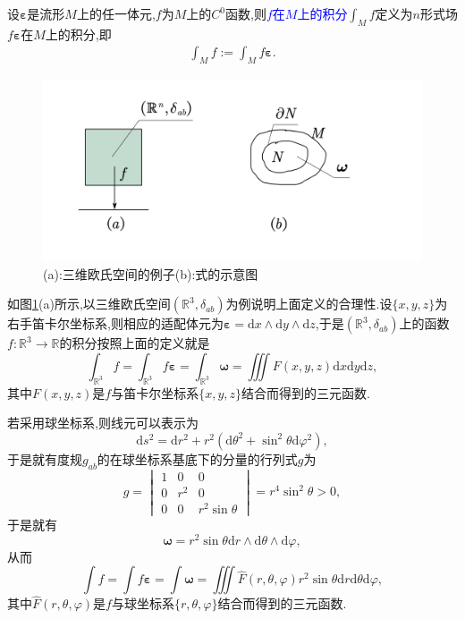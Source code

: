 设$\boldsymbol{\varepsilon}$是流形$M$上的任一体元,$f$为$M$上的$C^0$函数,则\textcolor{blue}{$f$在$M$上的积分}$\displaystyle \int_M f$定义为$n$形式场$f\boldsymbol{\varepsilon}$在$M$上的积分,即
\begin{align}
\int_Mf:=\int_M f\boldsymbol{\varepsilon}.
\end{align}
\begin{remark}
\begin{figure}[htbp]
    \centering
 \includegraphics[width=\textwidth]{Pictures/5-5.png}
    \caption{(a):三维欧氏空间的例子(b):式的示意图}
    \label{fig:5-5}
\end{figure}

如图\ref{fig:5-5}(a)所示,以三维欧氏空间$(\mathbb{R}^3,\delta_{ab})$为例说明上面定义的合理性.设$\{x,y,z\}$为右手笛卡尔坐标系,则相应的适配体元为$\boldsymbol{\varepsilon}=\mathrm{d}x\wedge\mathrm{d}y\wedge\mathrm{d}z$,于是$(\mathbb{R}^3,\delta_{ab})$上的函数$f:\mathbb{R}^3\to\mathbb{R}$的积分按照上面的定义就是
$$
\int_{\mathbb{R}^3}f=\int_{\mathbb{R}^3}f\boldsymbol{\varepsilon}=\int_{\mathbb{R}^3}\boldsymbol{\omega}=\iiint F(x,y,z)\mathrm{d}x\mathrm{d}y\mathrm{d}z,
$$
其中$F(x,y,z)$是$f$与笛卡尔坐标系$\{x,y,z\}$结合而得到的三元函数.

若采用球坐标系,则线元可以表示为$$
\mathrm{d}s^2=\mathrm{d}r^2+r^2(\mathrm{d}\theta^2+\sin^2\theta\mathrm{d}\varphi^2),
$$
于是就有度规$g_{ab}$的在球坐标系基底下的分量的行列式$g$为
$$g=\begin{vmatrix}
    1 & 0&0 \\
    0 & r^2&0\\
    0 & 0&r^2\sin\theta
    \end{vmatrix}=r^4\sin^2\theta>0,$$
    于是就有$$
    \boldsymbol{\omega}=r^2\sin\theta \mathrm{d}r\wedge \mathrm{d}\theta\wedge\mathrm{d}\varphi,
    $$
   从而
   $$\int f=\int f\boldsymbol{\varepsilon}=\int\boldsymbol{\omega}=\iiint\hat{F}(r,\theta,\varphi)r^2\sin\theta\mathrm{d}r\mathrm{d}\theta\mathrm{d}\varphi,$$
   其中$\hat{F}(r,\theta,\varphi)$是$f$与球坐标系$\{r,\theta,\varphi\}$结合而得到的三元函数.
\end{remark}
